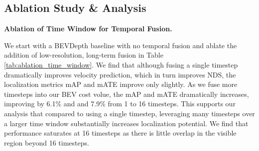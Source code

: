 \documentclass[runningheads, hyperfootnotes=false]{article}
\begin{document}
\subsection{Ablation Study \& Analysis}
\noindent\textbf{Ablation of Time Window for Temporal Fusion.}
\begin{table*}
\centering
\captionsetup{aboveskip=0pt}\captionsetup{belowskip=0pt}
\label{tab:ablation_time_window}
\tiny
{}
\end{table*} We start with a BEVDepth baseline with no temporal fusion and ablate the addition of low-resolution, long-term fusion in Table \ref{tab:ablation_time_window}. We find that although fusing a single timestep dramatically improves velocity prediction, which in turn improves NDS, the localization metrics mAP and mATE improve only slightly. As we fuse more timesteps into our BEV cost volue, the mAP and mATE dramatically increases, improving by 6.1\% and and 7.9\% from 1 to 16 timesteps. This supports our analysis that compared to using a single timestep, leveraging many timesteps over a larger time window substantially increases localization potential. We find that performance saturates at 16 timesteps as there is little overlap in the visible region beyond 16 timesteps.
\end{document}
